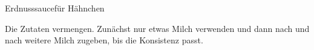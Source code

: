 \begin{recipe}{Erdnusssauce}{für Hähnchen}
  \inglist

  \steps
  Die Zutaten vermengen. Zunächst nur etwas Milch verwenden und dann nach und
  nach weitere Milch zugeben, bis die Konsistenz passt.
\end{recipe}
